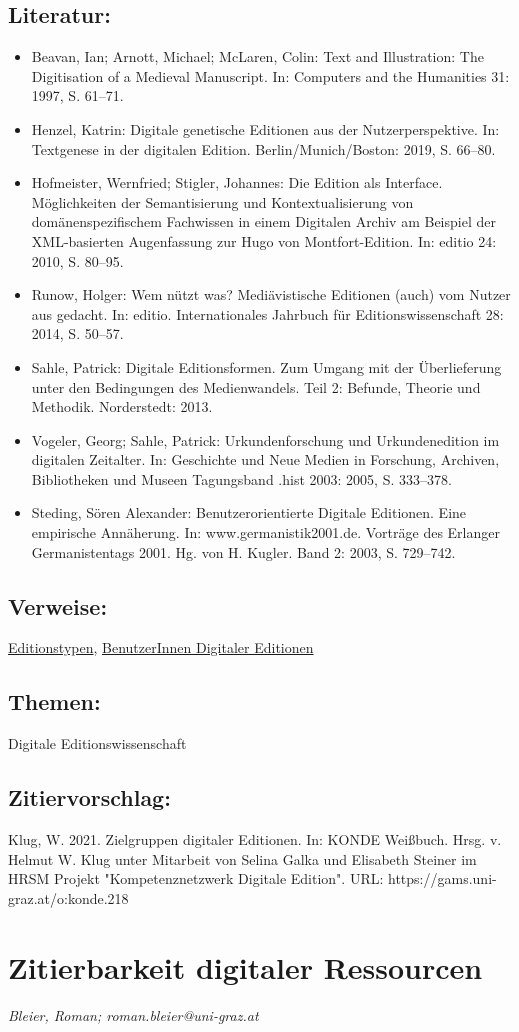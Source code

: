 \documentclass{article}
\begin{document}
        \subsection*{Literatur:}\begin{itemize}\item Beavan, Ian; Arnott, Michael; McLaren, Colin: Text and Illustration: The Digitisation of a Medieval Manuscript. In: Computers and the Humanities 31: 1997, S. 61–71.\item Henzel, Katrin: Digitale genetische Editionen aus der Nutzerperspektive. In: Textgenese in der digitalen Edition. Berlin/Munich/Boston: 2019, S. 66–80.\item Hofmeister, Wernfried; Stigler, Johannes: Die Edition als Interface. Möglichkeiten der Semantisierung und Kontextualisierung von domänenspezifischem Fachwissen in einem Digitalen Archiv am Beispiel der XML-basierten Augenfassung zur Hugo von Montfort-Edition. In: editio 24: 2010, S. 80–95.\item Runow, Holger: Wem nützt was? Mediävistische Editionen (auch) vom Nutzer aus gedacht. In: editio. Internationales Jahrbuch für Editionswissenschaft 28: 2014, S. 50–57.\item Sahle, Patrick: Digitale Editionsformen. Zum Umgang mit der Überlieferung unter den Bedingungen des Medienwandels. Teil 2: Befunde, Theorie und Methodik. Norderstedt: 2013.\item Vogeler, Georg; Sahle, Patrick: Urkundenforschung und Urkundenedition im digitalen Zeitalter. In: Geschichte und Neue Medien in Forschung, Archiven, Bibliotheken und Museen Tagungsband .hist 2003: 2005, S. 333–378.\item Steding, Sören Alexander: Benutzerorientierte Digitale Editionen. Eine empirische Annäherung. In: www.germanistik2001.de. Vorträge des Erlanger Germanistentags 2001. Hg. von H. Kugler. Band 2: 2003, S. 729–742.\end{itemize}\subsection*{Verweise:}\href{https://gams.uni-graz.at/o:konde.76}{Editionstypen}, \href{https://gams.uni-graz.at/o:konde.148}{BenutzerInnen Digitaler Editionen}\subsection*{Themen:}Digitale Editionswissenschaft\subsection*{Zitiervorschlag:}Klug, W. 2021. Zielgruppen digitaler Editionen. In: KONDE Weißbuch. Hrsg. v. Helmut W. Klug unter Mitarbeit von Selina Galka und Elisabeth Steiner im HRSM Projekt "Kompetenznetzwerk Digitale Edition". URL: https://gams.uni-graz.at/o:konde.218\newpage\section*{Zitierbarkeit digitaler Ressourcen} \emph{Bleier, Roman; roman.bleier@uni-graz.at }\\
        
\end{document}
